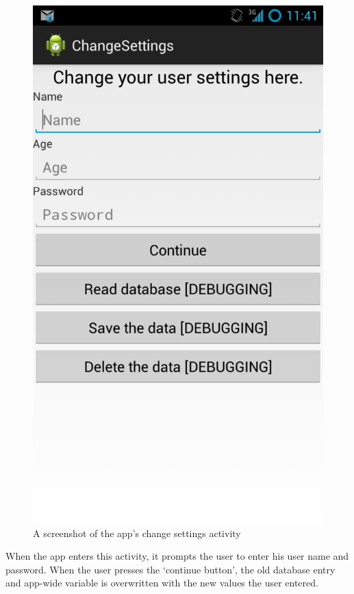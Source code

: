 \begin{figure}
 \centering 
 \includegraphics[clip = true, trim = 0 320 0 60,
 scale=0.2]{change_settings}
 \caption{A screenshot of the app's change settings activity}
 \label{fig:change-settings-screenshot}
\end{figure}

When the app enters this activity, it prompts the user to enter his user
name and password. When the user presses the `continue button', the old database
entry and app-wide variable is overwritten with the new values the user entered.

